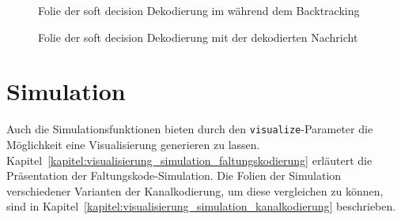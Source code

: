 \begin{figure}[th]
	\centering
	\caption{Folie der soft decision Dekodierung im während dem Backtracking}
	\label{abb:folie_dekodierung_3}
\end{figure}
\begin{figure}[th]
	\centering
	\caption{Folie der soft decision Dekodierung mit der dekodierten Nachricht}
	\label{abb:folie_dekodierung_4}
\end{figure}

\section{Simulation}
\label{kapitel:visualisierung_simulation}
Auch die Simulationsfunktionen bieten durch den \texttt{visualize}-Parameter die Möglichkeit eine Visualisierung generieren zu lassen. Kapitel~\ref{kapitel:visualisierung_simulation_faltungskodierung} erläutert die Präsentation der Faltungskode-Simulation. Die Folien der Simulation verschiedener Varianten der Kanalkodierung, um diese vergleichen zu können, sind in Kapitel~\ref{kapitel:visualisierung_simulation_kanalkodierung} beschrieben.

